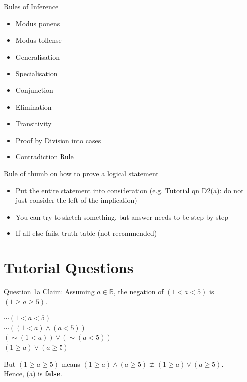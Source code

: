 \documentclass[10pt]{beamer}
\begin{document}
\begin{frame}[fragile]{Rules of Inference}
\begin{itemize}
  \item Modus ponens
  \item Modus tollense
  \item Generalisation
  \item Specialisation
  \item Conjunction
  \item Elimination
  \item Transitivity
  \item Proof by Division into cases
  \item Contradiction Rule 
\end{itemize}
\end{frame}

\begin{frame}[fragile]{Rule of thumb on how to prove a logical statement}
\begin{itemize}
\item Put the entire statement into consideration (e.g. Tutorial qn D2(a): do not just consider the left of the implication)
\item You can try to sketch something, but answer needs to be step-by-step
\item If all else fails, truth table (not recommended)
\end{itemize}
\end{frame}

\section[Tutorial Questions (and Photo Taking)]{Tutorial Questions}

\begin{frame}[fragile]{Question 1a}
    Claim: Assuming $a \in \mathbb{R}$, the negation of $(1 < a < 5)$ is $(1 \geq a \geq 5)$.
    \begin{center}
        $\sim (1 < a < 5)$ \\
        $\sim ((1 < a) \land (a < 5))$ \\
        $(\sim (1 < a)) \lor (\sim (a < 5))$ \\
        $(1 \geq a) \lor (a \geq 5)$ \\
    \end{center}
    But $(1 \geq  a \geq 5)$ means $(1 \geq a) \land (a \geq 5) \not\equiv (1 \geq a) \lor (a \geq 5)$. \\
    Hence, (a) is \textbf{false}.
\end{frame}
\end{document}
